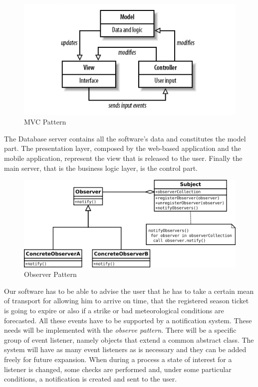 
\begin{figure}[H]
	\centering
	\includegraphics[scale=0.4]{Images/Patterns/MVC_Pattern}
	\caption{MVC Pattern}
\end{figure}
The Database server contains all the software’s data and constitutes the model part. The presentation layer, composed by the web-based application and the mobile application, represent the view that is released to the user. Finally the main server,  that is the business logic layer, is the control part.

\begin{figure}[H]
	\centering
	\includegraphics[scale=0.45]{Images/Patterns/Observer_Pattern}
	\caption{Observer Pattern}
\end{figure}
Our software has to be able to advise the user that he has to take a certain mean of transport for allowing him to arrive on time, that the registered season ticket is going to expire or also if a strike or bad meteorological conditions are forecasted. All these events have to be supported by a notification system. These needs will be implemented with the \emph{observe pattern}.  There will be a specific group of event listener, namely objects that extend a common abstract class. The system will have as many event listeners as is necessary and they can be added freely for future expansion. When during a process a state of interest for a listener is changed, some checks are performed and, under some particular conditions, a notification is created and sent to the user. 

